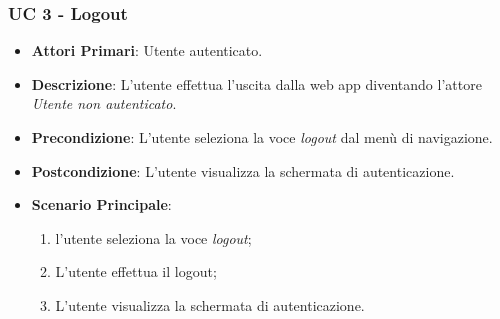 		\subsubsection{UC 3 - Logout}
		\begin{itemize}
			\item \textbf{Attori Primari}: Utente autenticato.
			\item \textbf{Descrizione}: L'utente effettua l'uscita dalla web app diventando l'attore \textit{Utente non autenticato}.
			\item \textbf{Precondizione}: L'utente seleziona la voce \textit{logout} dal menù di navigazione.
			\item \textbf{Postcondizione}: L'utente visualizza la schermata di autenticazione.
			\item \textbf{Scenario Principale}:
			\begin{enumerate}
				\item l'utente seleziona la voce \textit{logout};
				\item L'utente effettua il logout;
				\item L'utente visualizza la schermata di autenticazione.
			\end{enumerate}	
		\end{itemize}


		


		



		


		



		



